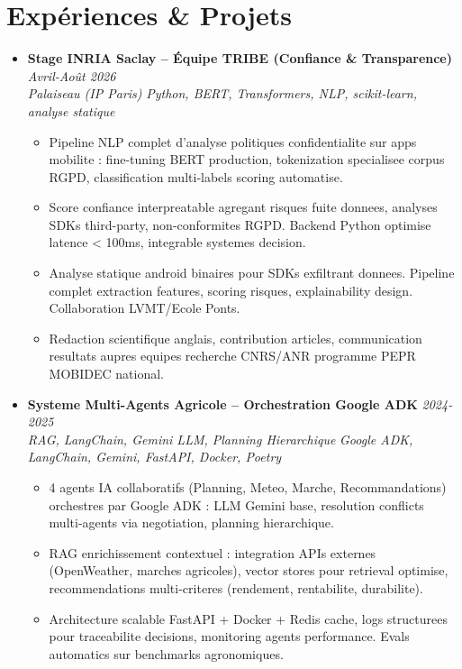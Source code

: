 \documentclass[a4paper,11pt]{article}
\begin{document}
\section{Exp\'eriences \& Projets}
\begin{itemize}[leftmargin=*, label={-}]

\item \textbf{Stage INRIA Saclay -- \'Equipe TRIBE (Confiance \& Transparence)} \hfill \textit{Avril-Ao\^ut 2026} \\
\textit{Palaiseau (IP Paris)} \hfill \textit{Python, BERT, Transformers, NLP, scikit-learn, analyse statique}
\vspace{-2pt}
    \begin{itemize}[leftmargin=0.4cm, nosep, label=\tiny$\bullet$]
        \item \small{Pipeline NLP complet d'analyse politiques confidentialite sur apps mobilite : fine-tuning BERT production, tokenization specialisee corpus RGPD, classification multi-labels scoring automatise.}
        \item \small{Score confiance interpreatable agregant risques fuite donnees, analyses SDKs third-party, non-conformites RGPD. Backend Python optimise latence < 100ms, integrable systemes decision.}
        \item \small{Analyse statique android binaires pour SDKs exfiltrant donnees. Pipeline complet extraction features, scoring risques, explainability design. Collaboration LVMT/Ecole Ponts.}
        \item \small{Redaction scientifique anglais, contribution articles, communication resultats aupres equipes recherche CNRS/ANR programme PEPR MOBIDEC national.}
    \end{itemize}
\vspace{3pt}

\item \textbf{Systeme Multi-Agents Agricole -- Orchestration Google ADK} \hfill \textit{2024-2025} \\
\textit{RAG, LangChain, Gemini LLM, Planning Hierarchique} \hfill \textit{Google ADK, LangChain, Gemini, FastAPI, Docker, Poetry}
\vspace{-2pt}
    \begin{itemize}[leftmargin=0.4cm, nosep, label=\tiny$\bullet$]
        \item \small{4 agents IA collaboratifs (Planning, Meteo, Marche, Recommandations) orchestres par Google ADK : LLM Gemini base, resolution conflicts multi-agents via negotiation, planning hierarchique.}
        \item \small{RAG enrichissement contextuel : integration APIs externes (OpenWeather, marches agricoles), vector stores pour retrieval optimise, recommendations multi-criteres (rendement, rentabilite, durabilite).}
        \item \small{Architecture scalable FastAPI + Docker + Redis cache, logs structurees pour traceabilite decisions, monitoring agents performance. Evals automatics sur benchmarks agronomiques.}
    \end{itemize}
\vspace{3pt}


\end{itemize}
\end{document}
